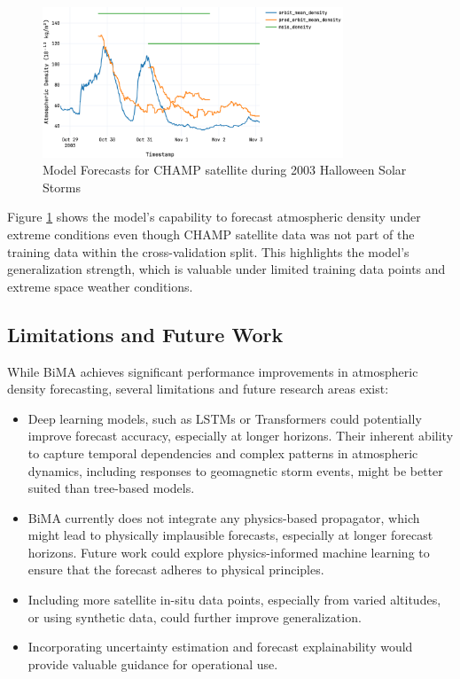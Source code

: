 \documentclass[11pt,a4paper]{storm-ai_report}
\begin{document}
\begin{figure}[h]
\centering
\includegraphics[width=0.8\textwidth]{images/plot/forecast-champ-oct-2003.png}
\captionsetup{width=0.9\textwidth}
\caption{Model Forecasts for CHAMP satellite during 2003 Halloween Solar Storms}
\label{fig:forecast_example}
\end{figure}

Figure \ref{fig:forecast_example} shows the model's capability to forecast atmospheric density under extreme conditions even though CHAMP satellite data was not part of the training data within the cross-validation split. This highlights the model's generalization strength, which is valuable under limited training data points and extreme space weather conditions.

\subsection{Limitations and Future Work}

While BiMA achieves significant performance improvements in atmospheric density forecasting, several limitations and future research areas exist:

\begin{itemize}
    \item Deep learning models, such as LSTMs or Transformers \cite{Briden2023} could potentially improve forecast accuracy, especially at longer horizons. Their inherent ability to capture temporal dependencies and complex patterns in atmospheric dynamics, including responses to geomagnetic storm events, might be better suited than tree-based models.
    \item BiMA currently does not integrate any physics-based propagator, which might lead to physically implausible forecasts, especially at longer forecast horizons. Future work could explore physics-informed machine learning to ensure that the forecast adheres to physical principles.
    \item Including more satellite in-situ data points, especially from varied altitudes, or using synthetic data, could further improve generalization.
    \item Incorporating uncertainty estimation \cite{Licata2022MSISUQ} and forecast explainability would provide valuable guidance for operational use.
\end{itemize}
\end{document}
